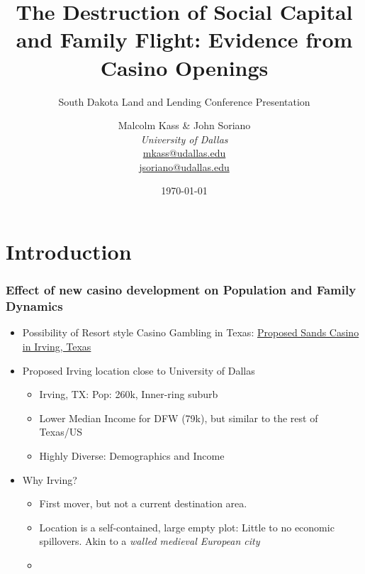 \documentclass[compress]{beamer}
\title{The Destruction of Social Capital and Family Flight: Evidence from Casino Openings}
\subtitle{South Dakota Land and Lending Conference Presentation}
\author{
	Malcolm Kass \& 
	John Soriano \\
	\vspace{0.5cm}
    {\it University of Dallas} \\
	\href{mailto:mkass@udallas.edu}{mkass@udallas.edu} \\
    \href{mailto:jsoriano@udallas.edu}{jsoriano@udallas.edu} }
\date{\today}
\begin{document}
	
	\begin{frame}
		\titlepage
	\end{frame}


\section{Introduction}
\begin{frame} \frametitle{Effect of new casino development on Population and Family Dynamics}
	\begin{itemize}
		\item Possibility of Resort style Casino Gambling in Texas: \href{https://www.dallasnews.com/news/politics/2025/06/30/what-to-know-about-las-vegas-sands-the-casino-giant-betting-big-on-north-texas/}{\color{blue}Proposed Sands Casino in Irving, Texas}  
        \item Proposed Irving location close to University of Dallas \begin{itemize}
            \item Irving, TX: Pop: 260k, Inner-ring suburb
            \item Lower Median Income for DFW (79k), but similar to the rest of Texas/US
            \item Highly Diverse: Demographics and Income
        \end{itemize}
        \item Why Irving?
        \begin{itemize}
        \item First mover, but not a current destination area. 
        \item Location is a self-contained, large empty plot: Little to no economic spillovers. Akin to a \textit{walled medieval European city }
        \item[] \href{https://maps.app.goo.gl/6p2Zy9oHBkHnfjDT7}%
{}
        \end{itemize}
    \end{itemize}
\end{frame}
\end{document}
